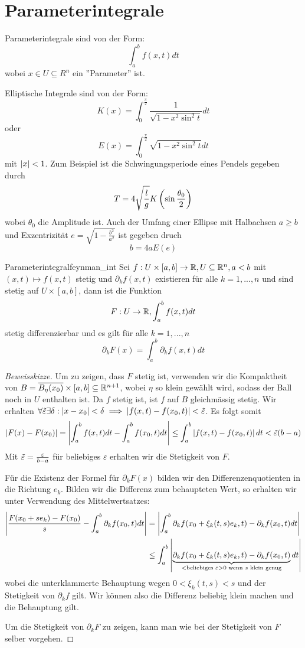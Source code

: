 \section{Parameterintegrale}
Parameterintegrale sind von der Form:
$$\int_a^b f(x,t) dt$$
wobei $x \in U \subseteq R^n$ ein ''Parameter'' ist.
\begin{example} Elliptische Integrale sind von der Form:
$$K(x) = \int_0^{\frac{\pi}{2}}\frac{1}{\sqrt{1-x^2\sin^2t}}dt$$
oder
$$E(x) = \int_0^{\frac{\pi}{2}}{\sqrt{1-x^2\sin^2t}}dt$$
mit $\left|x\right| < 1$. Zum Beispiel ist die Schwingungsperiode eines Pendels gegeben durch
$$T = 4 \sqrt{\frac{l}{g}}K\left(\sin\frac{\theta_0}{2}\right)$$
wobei $\theta_0$ die Amplitude ist. Auch der Umfang einer Ellipse mit Halbachsen $a \geq b$ und Exzentrizität $e = \sqrt{1-\frac{b^2}{a^2}}$ ist gegeben druch
$$b = 4 a E(e)$$
\end{example}

\begin{satz}{Parameterintegral}{feynman_int}
Sei $f: U \times [a,b] \to \mathbb{R}, U \subseteq \mathbb{R}^n, a<b$ mit $(x,t) \mapsto f(x,t)$ stetig und $\partial_k f(x,t)$ existieren für alle $k = 1,...,n$ und sind stetig auf $U \times [a,b]$, dann ist die Funktion 
$$F: U \to \mathbb{R}, \int_a^bf(x,t) dt$$
stetig differenzierbar und es gilt für alle $k = 1,...,n$
$$\partial_k F(x) = \int_a^b\partial_kf(x,t) dt$$
\end{satz} 
\begin{proof}[Beweisskizze] Um zu zeigen, dass $F$ stetig ist, verwenden wir die Kompaktheit von $B = \overline{B_\eta(x_0)}\times [a,b] \subseteq  \mathbb{R}^{n+1}$, wobei $\eta$ so klein gewählt wird, sodass der Ball noch in $U$ enthalten ist. Da $f$ stetig ist, ist $f$ auf $B$ gleichmässig stetig. Wir erhalten $\forall \Tilde{\varepsilon} \exists \delta:\left|x-x_0\right| < \delta \implies \left|f(x,t) - f(x_0,t)\right|<\Tilde{\varepsilon}$. Es folgt somit
$$\left|F(x)-F(x_0)\right| = \left| \int_a^b f(x,t) dt -  \int_a^b f(x_0,t) dt\right| \leq  \int_a^b \left|f(x,t) - f(x_0,t)\right|dt < \Tilde{\varepsilon} (b-a)$$
Mit $\Tilde{\varepsilon} = \frac{\varepsilon}{b-a}$ für beliebiges $\varepsilon$ erhalten wir die Stetigkeit von $F$.

Für die Existenz der Formel für $\partial_k F(x)$ bilden wir den Differenzenquotienten in die Richtung $e_k$. Bilden wir die Differenz zum behaupteten Wert, so erhalten wir unter Verwendung des Mittelwertsatzes:
\begin{align*}
    \left|\frac{F(x_0+se_k) - F(x_0)}{s}- \int_a^b \partial_kf(x_0,t) dt\right| &= \left|\int_a^b\partial_kf(x_0+\xi_k(t,s)e_k,t) - \partial_kf(x_0,t)dt\right| \\ &\leq \int_a^b\left|\underbrace{\partial_kf(x_0+\xi_k(t,s)e_k,t) - \partial_kf(x_0,t)}_{< \text{beliebiges } \varepsilon > 0 \text{ wenn $s$ klein genug}}dt\right|
\end{align*}
wobei die unterklammerte Behauptung wegen $0 < \xi_k(t,s) < s$ und der Stetigkeit von $\partial_kf$ gilt. Wir können also die Differenz beliebig klein machen und die Behauptung gilt.

Um die Stetigkeit von $\partial_kF$ zu zeigen, kann man wie bei der Stetigkeit von $F$ selber vorgehen.
\end{proof}


